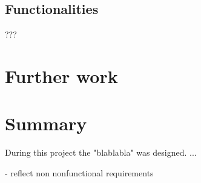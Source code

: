 \subsection{Functionalities}
???
\section{Further work}
\section{Summary}
During this project the "blablabla" was designed. ...


- reflect non nonfunctional requirements